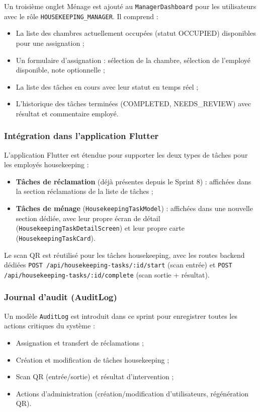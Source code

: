 Un troisième onglet \og Ménage \fg{} est ajouté au \texttt{ManagerDashboard} pour les utilisateurs avec le rôle \texttt{HOUSEKEEPING\_MANAGER}. Il comprend :
\begin{itemize}
  \item La liste des chambres actuellement occupées (statut OCCUPIED) disponibles pour une assignation ;
  \item Un formulaire d'assignation : sélection de la chambre, sélection de l'employé disponible, note optionnelle ;
  \item La liste des tâches en cours avec leur statut en temps réel ;
  \item L'historique des tâches terminées (COMPLETED, NEEDS\_REVIEW) avec résultat et commentaire employé.
\end{itemize}

\subsubsection{Intégration dans l'application Flutter}

L'application Flutter est étendue pour supporter les deux types de tâches pour les employés housekeeping :
\begin{itemize}
  \item \textbf{Tâches de réclamation} (déjà présentes depuis le Sprint 8) : affichées dans la section réclamations de la liste de tâches ;
  \item \textbf{Tâches de ménage} (\texttt{HousekeepingTaskModel}) : affichées dans une nouvelle section dédiée, avec leur propre écran de détail (\texttt{HousekeepingTaskDetailScreen}) et leur propre carte (\texttt{HousekeepingTaskCard}).
\end{itemize}

Le scan QR est réutilisé pour les tâches housekeeping, avec les routes backend dédiées \texttt{POST /api/housekeeping-tasks/:id/start} (scan entrée) et \texttt{POST /api/housekeeping-tasks/:id/complete} (scan sortie + résultat).

\subsubsection{Journal d'audit (AuditLog)}

Un modèle \texttt{AuditLog} est introduit dans ce sprint pour enregistrer toutes les actions critiques du système :
\begin{itemize}
  \item Assignation et transfert de réclamations ;
  \item Création et modification de tâches housekeeping ;
  \item Scan QR (entrée/sortie) et résultat d'intervention ;
  \item Actions d'administration (création/modification d'utilisateurs, régénération QR).
\end{itemize}

